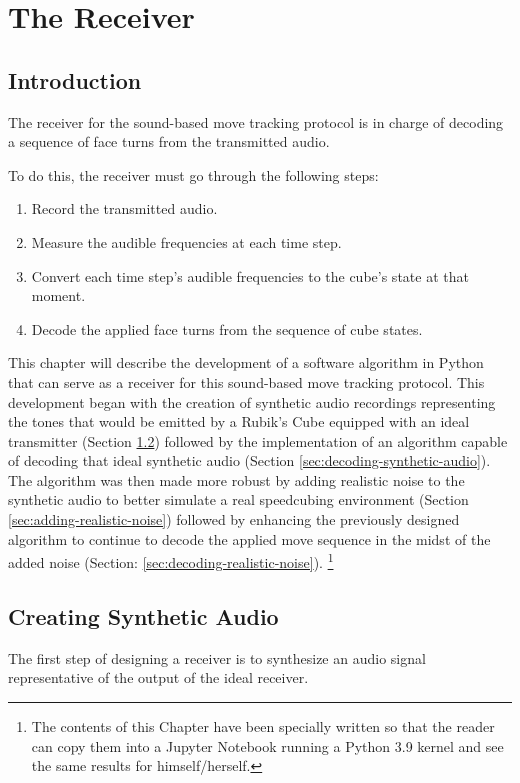 
\chapter{The Receiver} %

\label{Chapter5}

\section{Introduction}
The receiver for the sound-based move tracking protocol is in charge of decoding a sequence of face turns from the transmitted audio.

To do this, the receiver must go through the following steps:
\begin{enumerate}
    \item Record the transmitted audio.
    \item Measure the audible frequencies at each time step.
    \item Convert each time step's audible frequencies to the cube's state at that moment.
    \item Decode the applied face turns from the sequence of cube states.
\end{enumerate}

This chapter will describe the development of a software algorithm in Python that can serve as a receiver for this sound-based move tracking protocol. 
This development began with the creation of synthetic audio recordings representing the tones that would be emitted by a Rubik's Cube equipped with an ideal transmitter (Section \ref{sec:synthetic-audio-generation}) followed by the implementation of an algorithm capable of decoding that ideal synthetic audio (Section \ref{sec:decoding-synthetic-audio}).
The algorithm was then made more robust by adding realistic noise to the synthetic audio to better simulate a real speedcubing environment (Section \ref{sec:adding-realistic-noise}) followed by enhancing the previously designed algorithm to continue to decode the applied move sequence in the midst of the added noise (Section: \ref{sec:decoding-realistic-noise}). \footnote{The contents of this Chapter have been specially written so that the reader can copy them into a Jupyter Notebook running a Python 3.9 kernel and see the same results for himself/herself.} 


\section{Creating Synthetic Audio}
\label{sec:synthetic-audio-generation}
The first step of designing a receiver is to synthesize an audio signal representative of the output of the ideal receiver.

